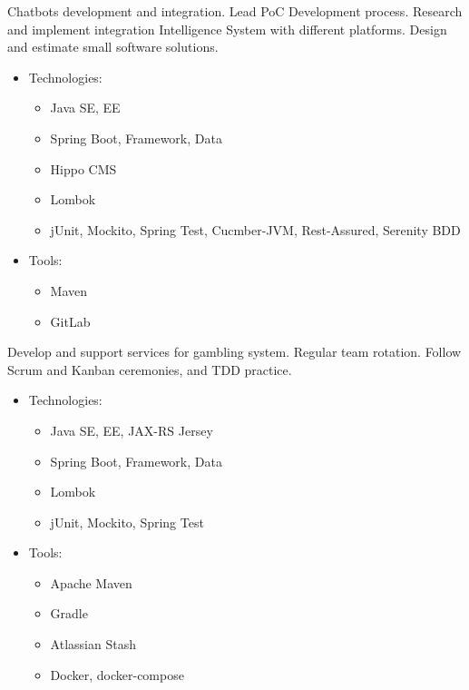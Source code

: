\documentclass[11pt, a4paper]{moderncv}
\begin{document}
{\begin{itemize}
{Chatbots development and integration. Lead PoC Development process. Research and implement integration Intelligence System with different platforms. Design and estimate small software solutions.
\begin{itemize}
\item Technologies:
\begin{itemize}
\item Java SE, EE
\item Spring Boot, Framework, Data
\item Hippo CMS
\item Lombok
\item jUnit, Mockito, Spring Test, Cucmber-JVM, Rest-Assured, Serenity BDD  
\end{itemize}
\item Tools:
\begin{itemize}
\item Maven
\item GitLab 
\end{itemize}
\end{itemize}}

{Develop and support services for gambling system. Regular team rotation. Follow Scrum and Kanban ceremonies, and TDD practice. 
\begin{itemize}
\item Technologies:
\begin{itemize}
\item Java SE, EE, JAX-RS Jersey
\item Spring Boot, Framework, Data
\item Lombok 
\item jUnit, Mockito, Spring Test
\end{itemize}
\item Tools:
\begin{itemize}
\item Apache Maven
\item Gradle
\item Atlassian Stash
\item Docker, docker-compose
\end{itemize}
\end{itemize}}


\end{itemize}}
\end{document}
